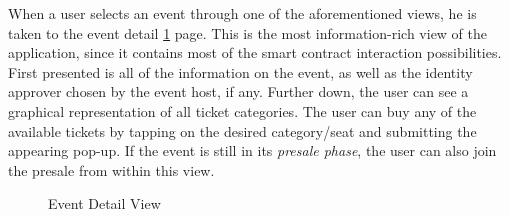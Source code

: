 When a user selects an event through one of the aforementioned views, he is taken to the event detail \ref{img:event-details} page. This is the most information-rich view of the application, since it contains most of the smart contract interaction possibilities. First presented is all of the information on the event, as well as the identity approver chosen by the event host, if any. Further down, the user can see a graphical representation of all ticket categories. The user can buy any of the available tickets by tapping on the desired category/seat and submitting the appearing pop-up. If the event is still in its \textit{presale phase}, the user can also join the presale from within this view. 
\begin{figure}[!tbp]
  \centering
  \hfill
    \hfill

  \caption{Event Detail View}
  \label{img:event-details}
\end{figure}
